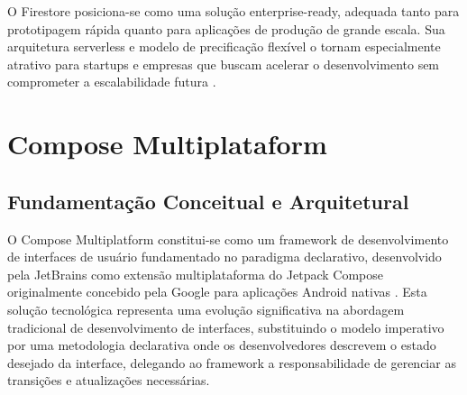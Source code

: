 O Firestore posiciona-se como uma solução enterprise-ready, adequada tanto para prototipagem rápida quanto para aplicações de produção de grande escala. Sua arquitetura serverless e modelo de precificação flexível o tornam especialmente atrativo para startups e empresas que buscam acelerar o desenvolvimento sem comprometer a escalabilidade futura \cite{firebase_io_2024}.

\begin{comment}
O Firestore foi arquitetado para proporcionar escalabilidade horizontal automática, adaptando-se dinamicamente ao volume de dados e quantidade de operações sem intervenção manual dos desenvolvedores \cite{google2023scalability}. Esta característica é particularmente relevante para aplicações com padrões de uso imprevisíveis ou crescimento exponencial de usuários, onde a capacidade de processamento deve ajustar-se automaticamente à demanda.

O modelo de precificação adotado segue uma estrutura pay-per-operation, onde os custos são calculados com base no número de operações de leitura, escrita e exclusão realizadas, complementado por tarifas de armazenamento e transferência de dados \cite{firebase2023pricing}. Esta abordagem granular de cobrança permite otimização de custos através do design eficiente de consultas e estratégias de cache, tornando-se economicamente viável tanto para projetos em escala reduzida quanto para aplicações empresariais de grande porte.

\end{comment}
\section{Compose Multiplataform}
\subsection{Fundamentação Conceitual e Arquitetural}

O Compose Multiplatform constitui-se como um framework de desenvolvimento de interfaces de usuário fundamentado no paradigma declarativo, desenvolvido pela JetBrains como extensão multiplataforma do Jetpack Compose originalmente concebido pela Google para aplicações Android nativas \cite{jetbrains2023compose}. Esta solução tecnológica representa uma evolução significativa na abordagem tradicional de desenvolvimento de interfaces, substituindo o modelo imperativo por uma metodologia declarativa onde os desenvolvedores descrevem o estado desejado da interface, delegando ao framework a responsabilidade de gerenciar as transições e atualizações necessárias.

